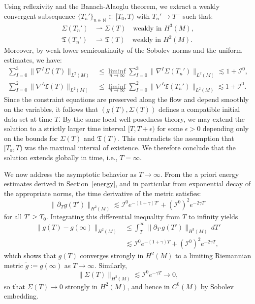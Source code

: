 \documentclass{amsart}
\begin{document}
\noindent Using reflexivity and the Banach-Alaoglu theorem, we extract a weakly convergent subsequence $\{T_n'\}_{n \in \mathbb{N}} \subset [T_0, T)$ with $T_n' \to T^-$ such that:
\begin{align*}
\Sigma(T_n') &\rightharpoonup \Sigma(T) \quad \text{weakly in } H^3(M), \\
\mathfrak{T}(T_n') &\rightharpoonup \mathfrak{T}(T) \quad \text{weakly in } H^2(M).
\end{align*}
Moreover, by weak lower semicontinuity of the Sobolev norms and the uniform estimates, we have:
\begin{align*}
\sum_{I = 0}^{3} \| \nabla^I \Sigma(T) \|_{L^2(M)} &\leq \liminf_{n \to \infty} \sum_{I = 0}^{3} \| \nabla^I \Sigma(T_n') \|_{L^2(M)} \lesssim 1 + \mathcal{I}^0, \\
\sum_{I = 0}^{2} \| \nabla^I \mathfrak{T}(T) \|_{L^2(M)} &\leq \liminf_{n \to \infty} \sum_{I = 0}^{2} \| \nabla^I \mathfrak{T}(T_n') \|_{L^2(M)} \lesssim 1 + \mathcal{I}^0.
\end{align*}
Since the constraint equations are preserved along the flow and depend smoothly on the variables, it follows that $(g(T), \Sigma(T))$ defines a compatible initial data set at time $T$. By the same local well-posedness theory, we may extend the solution to a strictly larger time interval $[T, T + \epsilon)$ for some $\epsilon > 0$ depending only on the bounds for $\Sigma(T)$ and $\mathfrak{T}(T)$. This contradicts the assumption that $[T_0, T)$ was the maximal interval of existence. We therefore conclude that the solution extends globally in time, i.e., $T = \infty$.

\noindent We now address the asymptotic behavior as $T \to \infty$. From the a priori energy estimates derived in Section~\ref{energy}, and in particular from exponential decay of the appropriate norms, the time derivative of the metric satisfies:
\[
\|\partial_T g(T')\|_{H^2(M)} \lesssim \mathcal{I}^0 e^{-(1 + \gamma) T'} + (\mathcal{I}^0)^2 e^{-2\gamma T'}
\]
for all $T' \geq T_0$. Integrating this differential inequality from $T$ to infinity yields
\begin{align*}
\| g(T) - g(\infty) \|_{H^2(M)} &\leq \int_T^{\infty} \| \partial_{T'} g(T') \|_{H^3(M)} \, dT' \\
&\lesssim \mathcal{I}^0 e^{-(1 + \gamma) T} + (\mathcal{I}^0)^2 e^{-2\gamma T},
\end{align*}
which shows that $g(T)$ converges strongly in $H^2(M)$ to a limiting Riemannian metric $\widetilde{g} := g(\infty)$ as $T \to \infty$. Similarly,
\[
\| \Sigma(T) \|_{H^2(M)} \lesssim \mathcal{I}^0 e^{-\gamma T} \to 0,
\]
so that $\Sigma(T) \to 0$ strongly in $H^2(M)$, and hence in $C^0(M)$ by Sobolev embedding.
\end{document}
